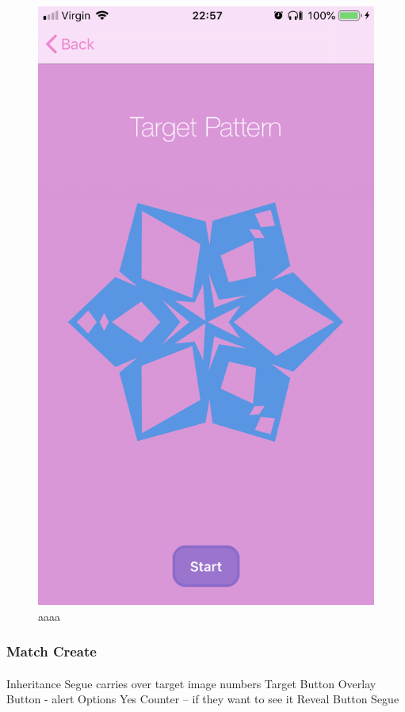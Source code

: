 \documentclass[11pt]{article}
\begin{document}
\begin{figure}[!ht]
\begin{minipage}{0.45\textwidth}
                            \includegraphics[width=0.7\linewidth]{KiriZen/complexTarget.png}
                            \caption{aaaa}
                            \label{fig:kiriZen-complexTarget}
                        \end{minipage}
                    \end{figure}
                    
        \subsubsection{Match Create}
    
            \paragraph{}
            
            Inheritance 
            Segue carries over target image numbers
            Target Button
            Overlay Button - alert
            Options
            Yes Counter – if they want to see it
            Reveal Button Segue
\end{document}
